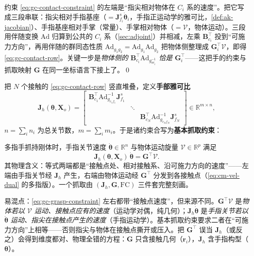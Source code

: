 \begin{derivation}[基本抓取约束的逐行化简]
\label{der:gc-Jh}
约束 \cref{eq:gc-contact-constraint} 的左端是“指尖相对物体在 $C_i$ 系的速度”。把它写成三段串联：指尖相对手指基座（$=\mathbf{J}^{s}_{f_i}\dot{\boldsymbol{\theta}}_i$，手指正运动学的雅可比，\cref{def:ak-jacobian}）、手指基座相对手掌（常量）、手掌相对物体（$=\mathcal{V}$，物体运动）。三段用伴随变换 $\mathrm{Ad}$ 归算到公共的 $C_i$ 系（\cref{sec:adjoint}）并相减，左乘 $\mathbf{B}_{c_i}^\top$ 投到“可施力方向”，再用伴随的群同态性质 $\mathrm{Ad}_{g_1g_2}=\mathrm{Ad}_{g_1}\mathrm{Ad}_{g_2}$ 把物体侧整理成 $\mathbf{G}_i^\top\mathcal{V}$，即得 \cref{eq:gc-contact-row}。关键一步是\emph{物体侧的 $\mathbf{B}_{c_i}^\top\mathrm{Ad}_{g_{oc_i}^{-1}}$ 恰是 $\mathbf{G}_i^\top$}——这把手的约束与抓取映射 $\mathbf{G}$ 在同一坐标语言下接上了。\qed
\end{derivation}

把 $N$ 个接触的 \cref{eq:gc-contact-row} 竖直堆叠，定义\textbf{手部雅可比}
\begin{equation}
  \mathbf{J}_h(\boldsymbol{\theta},\mathbf{X}_o)
  =\begin{bmatrix}
    \mathbf{B}_{c_1}^\top\mathrm{Ad}_{g_{c_1f_1}}^{-1}\mathbf{J}^{s}_{f_1} & & \\
    & \ddots & \\
    & & \mathbf{B}_{c_N}^\top\mathrm{Ad}_{g_{c_Nf_N}}^{-1}\mathbf{J}^{s}_{f_N}
  \end{bmatrix}\in\mathbb{R}^{m\times n},
  \label{eq:gc-Jh-def}
\end{equation}
$n=\sum_i n_i$ 为总关节数，$m=\sum_i m_i$。于是诸约束合写为\textbf{基本抓取约束}：

\begin{theorem}[基本抓取约束]
\label{thm:gc-grasp-constraint}
多指手抓持刚体时，手指关节速度 $\dot{\boldsymbol{\theta}}\in\mathbb{R}^n$ 与物体运动旋量 $\mathcal{V}\in\mathbb{R}^p$ 满足
\begin{equation}
  \boxed{\ \mathbf{J}_h(\boldsymbol{\theta},\mathbf{X}_o)\,\dot{\boldsymbol{\theta}}=\mathbf{G}^\top\mathcal{V}.\ }
  \label{eq:gc-grasp-constraint}
\end{equation}
其物理含义：等式两端都是“接触点处、相对接触系、沿可施力方向的速度”——左端由手指关节经 $\mathbf{J}_h$ 产生，右端由物体运动经 $\mathbf{G}^\top$ 分发到各接触点（\cref{eq:cm-vel-dual} 的多指版）。一个抓取由 $(\mathbf{J}_h,\mathbf{G},\mathrm{FC})$ 三件套完整刻画。
\end{theorem}

\begin{note}
易混点：\cref{eq:gc-grasp-constraint} 左右都带“接触点速度”，但来源不同。$\mathbf{G}^\top\mathcal{V}$ 是\emph{物体若以 $\mathcal{V}$ 运动、接触点应有的速度}（运动学对偶，纯几何）；$\mathbf{J}_h\dot{\boldsymbol{\theta}}$ 是\emph{手指关节若以 $\dot{\boldsymbol{\theta}}$ 运动、指尖在接触点产生的速度}（手指运动学）。基本抓取约束要求二者在“可施力方向”上相等——否则指尖与物体在接触点撕开或压入。把 $\mathbf{G}^\top$ 误当 $\mathbf{J}_h$（或反之）会得到维度都对、物理全错的方程：$\mathbf{G}$ 只含接触几何（$\mathbf{r}_i$），$\mathbf{J}_h$ 含手指构型（$\boldsymbol{\theta}$）。
\end{note}

